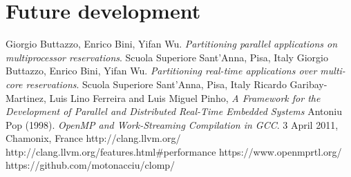 \documentclass[a4paper,11pt,oneside]{book}
\begin{document}
\section{Future development}

\begin{thebibliography}{9}
 Giorgio Buttazzo, Enrico Bini, Yifan Wu. \emph{Partitioning parallel applications on multiprocessor reservations}. Scuola Superiore Sant’Anna, Pisa, Italy
 Giorgio Buttazzo, Enrico Bini, Yifan Wu. \emph{Partitioning real-time applications over multi-core reservations}. Scuola Superiore Sant’Anna, Pisa, Italy
 Ricardo Garibay-Martinez, Luis Lino Ferreira and Luis Miguel Pinho, \emph{A Framework for the Development of Parallel and Distributed Real-Time Embedded Systems}
Antoniu Pop (1998). \emph{OpenMP and Work-Streaming Compilation in GCC}. 3 April 2011, Chamonix, France
http://clang.llvm.org/
http://clang.llvm.org/features.html\#performance
https://www.openmprtl.org/
https://github.com/motonacciu/clomp/


\end{thebibliography}
\end{document}
